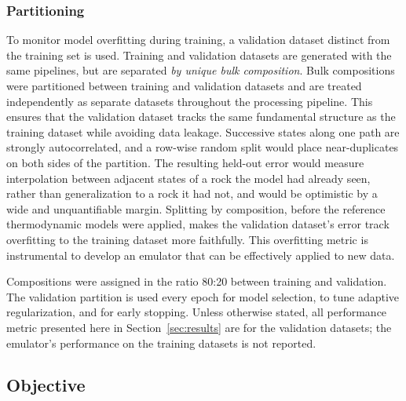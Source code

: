 
\subsubsection{Partitioning}
\label{sec:split}

To monitor model overfitting during training, a validation dataset distinct from the training set is used. Training and validation datasets are generated with the same pipelines, but are separated \emph{by unique bulk
composition}. Bulk compositions were partitioned between training and validation datasets and are treated independently as separate datasets throughout the processing pipeline. 
This ensures that the validation dataset tracks the same fundamental structure as the training dataset while avoiding data leakage.
Successive states along one path are strongly autocorrelated, and a row-wise random
split would place near-duplicates on both sides of the partition. The resulting
held-out error would measure interpolation between adjacent states of a rock the
model had already seen, rather than generalization to a rock it had not, and would be
optimistic by a wide and unquantifiable margin. Splitting by composition, before the reference thermodynamic
models were applied, makes the validation dataset's error track overfitting to the training dataset more faithfully. 
This overfitting metric is instrumental to develop an emulator that can be effectively applied to new data. 

Compositions were assigned in the ratio 80:20 between training and validation. 
The validation partition is used every epoch for model selection, to tune adaptive regularization, and for early stopping. 
Unless otherwise stated, all performance metric presented here in Section~\ref{sec:results} are for the validation datasets; the emulator's performance on the training datasets is not reported. 



\subsection{Objective}
\label{sec:objective}

